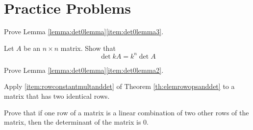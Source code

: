 \documentclass{ximera}
\begin{document}
\section*{Practice Problems}



\begin{problem}\label{prob:proofdet0lemma}
Prove Lemma \ref{lemma:det0lemma}\ref{item:det0lemma3}.
\end{problem}



\begin{problem}\label{prob:kAdet}
Let $A$ be an $n\times n$ matrix.  Show that 
$$\det{kA}=k^n\det{A}$$
\end{problem}

\begin{problem}\label{prob:proofdet0lemma2}
Prove Lemma \ref{lemma:det0lemma}\ref{item:det0lemma2}.
\begin{hint} 
Apply \ref{item:rowconstantmultanddet} of Theorem \ref{th:elemrowopsanddet} to a matrix that has two identical rows.
\end{hint}
\end{problem}


\begin{problem}\label{prob:onerowlincombanotherdet}
Prove that if one row of a matrix is a linear combination of two other rows of the matrix, then the determinant of the matrix is 0.
\end{problem}
\end{document}
